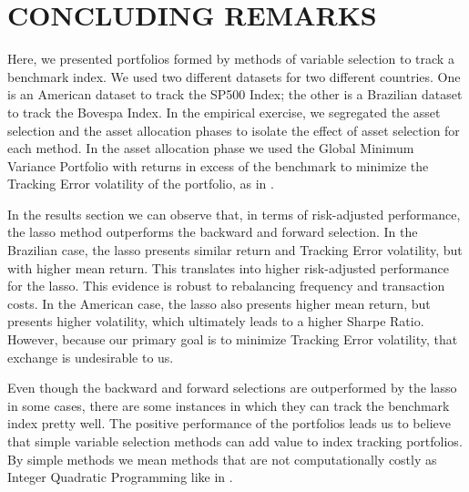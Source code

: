 \documentclass[12pt,oneside,a4paper]{memoir}
\begin{document}
\section{CONCLUDING REMARKS} \label{sec:conc}

Here, we presented portfolios formed by methods of variable selection to track a benchmark index.
We used two different datasets for two different countries.
One is an American dataset to track the SP500 Index; the other is a Brazilian dataset to track the Bovespa Index.
In the empirical exercise, we segregated the asset selection and the asset allocation phases to isolate the effect of asset selection for each method.
In the asset allocation phase we used the Global Minimum Variance Portfolio with returns in excess of the benchmark to minimize the Tracking Error volatility of the portfolio, as in .

In the results section we can observe that, in terms of risk-adjusted performance, the lasso method outperforms the backward and forward selection. 
In the Brazilian case, the lasso presents similar return and Tracking Error volatility, but with higher mean return.
This translates into higher risk-adjusted performance for the lasso.
This evidence is robust to rebalancing frequency and transaction costs.
In the American case, the lasso also presents higher mean return, but presents higher volatility, which ultimately leads to a higher Sharpe Ratio.
However, because our primary goal is to minimize Tracking Error volatility, that exchange is undesirable to us.

Even though the backward and forward selections are outperformed by the lasso in some cases, there are some instances in which they can track the benchmark index pretty well.
The positive performance of the portfolios leads us to believe that simple variable selection methods can add value to index tracking portfolios.
By simple methods we mean methods that are not computationally costly as Integer Quadratic Programming like in .



\clearpage

\clearpage

\end{document}
